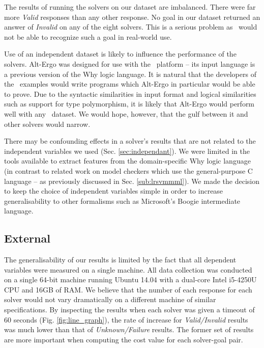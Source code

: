 The results of running the solvers on our dataset are imbalanced. There were far more \textit{Valid} responses than any other response. 
No goal in our dataset returned an answer of \textit{Invalid} on any of the eight solvers. 
This is a serious problem as \where~would not be able to recognize such a goal in real-world use. 

Use of an independent dataset is likely to influence the performance of the solvers. 
Alt-Ergo was designed for use with the \why~platform -- its input language is a previous version of the Why logic language. 
It is natural that the developers of the \why~examples would write programs which Alt-Ergo in particular would be able to prove. 
Due to the syntactic similarities in input format and logical similarities such as support for type polymorphism, it is likely that Alt-Ergo would perform well with any \why~dataset. We would hope, however, that the gulf between it and other solvers would narrow.

There may be confounding effects in a solver's results that are not related to the independent variables we used (Sec. \ref{sec:independant}). 
We were limited in the tools available to extract features from the domain-specific Why logic language (in contrast to related work on model checkers which use the general-purpose C language \cite{DPVZ15:CAV, MUX} -- as previously discussed in Sec. \ref{sub:lrsvmmml}). 
We made the decision to keep the choice of independent variables simple in order to increase generalisability to other formalisms such as Microsoft's Boogie \cite{Boogie} intermediate language.  

\subsection{External}


The generalisability of our results is limited by the fact that all dependent variables were measured on a single machine.
All data collection was conducted on a single 64-bit machine running Ubuntu 14.04 with a dual-core Intel i5-4250U CPU and 16GB of RAM. 
We believe that the number of each response for each solver would not vary dramatically on a different machine of similar specifications. 
By inspecting the results when each solver was given a timeout of 60 seconds (Fig. \ref{fig:line_graph}), the rate of increase for \textit{Valid/Invalid} results was much lower than that of \textit{Unknown/Failure} results. 
The former set of results are more important when computing the cost value for each solver-goal pair.

